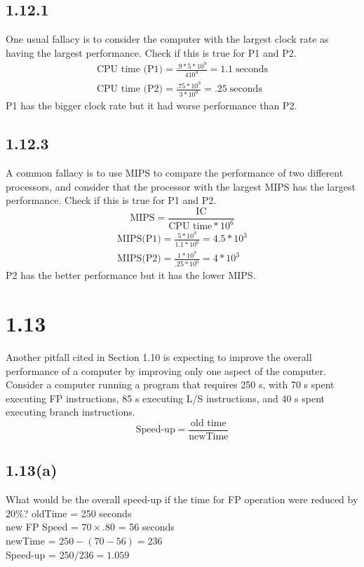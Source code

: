 \documentclass[12pt]{article}
\begin{document}
\subsection*{1.12.1}
One usual fallacy is to consider the computer with the largest clock rate as having the largest performance.  Check if this is true for P1 and P2.
\begin{gather*}
\text{CPU time (P1)} = \frac{.9*5*10^9}{410^9} = 1.1\;\text{seconds}\\
\text{CPU time (P2)} = \frac{.75*10^9}{3*10^9} = .25\;\text{seconds}
\end{gather*}
P1 has the bigger clock rate but it had worse performance than P2.

\subsection*{1.12.3}
A common fallacy is to use MIPS to compare the performance of two different
processors, and consider that the processor with the largest MIPS has the largest
performance.  Check if this is true for P1 and P2.
\begin{equation*}
\text{MIPS} = \frac{\text{IC}}{\text{CPU time}*10^6}
\end{equation*}
\begin{gather*}
\text{MIPS(P1)} = \frac{5*10^9}{1.1*10^{6}} = 4.5*10^3\\
\text{MIPS(P2)} = \frac{1*10^9}{.25*10^6} = 4*10^3
\end{gather*}
P2 has the better performance but it has the lower MIPS.



\section*{1.13}
Another pitfall cited in Section 1.10 is expecting to improve the overall
performance of a computer by improving only one aspect of the computer.  Consider
a computer running a program that requires 250 s, with 70 s spent executing FP
instructions, 85 s executing L/S instructions, and 40 s spent executing branch
instructions.
\begin{equation}
	\text{Speed-up} = \frac{\text{old time}}{\text{newTime}}
\end{equation}

\subsection*{1.13(a)}
What would be the overall speed-up if the time for FP operation were reduced by 20\%?
oldTime = 250 seconds\\
new FP Speed = $70\times{.80}$ = 56 seconds\\
newTime = $250 - (70 - 56) = 236$\\
Speed-up = $250/236 = 1.059$
\end{document}
